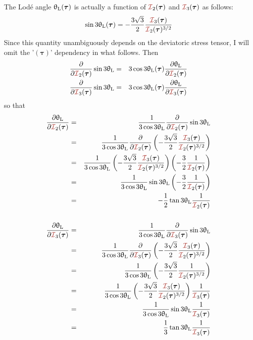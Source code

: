 The Lod\'e angle $\uptheta_{\rm L}(\bm\tau)$ 
is actually a function of ${\III}_2(\bm\tau)$ and ${\III}_3(\bm\tau)$ as follows:
\[
\sin 3\uptheta_{\rm L}(\bm\tau) = 
-\frac{3\sqrt{3}}{2}  \frac{{\III}_3(\bm\tau)}{{\III}_2(\bm\tau)^{3/2}} 
\]
Since this quantity unambiguously depends on the deviatoric stress tensor, 
I will omit the '$(\bm\tau)$' dependency in what follows.
Then
\begin{eqnarray}
\frac{\partial }{\partial {\III}_2(\bm\tau)} \sin 3\uptheta_{\rm L}
&=&3\cos 3\uptheta_{\rm L}(\bm\tau)  \frac{\partial \uptheta_{\rm L}}{\partial {\III}_2(\bm\tau)}\nn\\
\frac{\partial }{\partial {\III}_3(\bm\tau)} \sin 3\uptheta_{\rm L}
&=&3 \cos 3\uptheta_{\rm L}(\bm\tau)  \frac{\partial \uptheta_{\rm L}}{\partial {\III}_3(\bm\tau)}\nn
\end{eqnarray}
so that 
\begin{eqnarray}
\frac{\partial \uptheta_{\rm L}}{\partial {\III}_2(\bm\tau)}
&=&\frac{1}{3 \cos 3\uptheta_{\rm L}} 
\frac{\partial }{\partial {\III}_2(\bm\tau)} \sin 3\uptheta_{\rm L}  \nonumber\\
&=&\frac{1}{3 \cos 3\uptheta_{\rm L}} 
\frac{\partial }{\partial {\III}_2(\bm\tau)}
\left(-\frac{3\sqrt{3}}{2}  \frac{{\III}_3(\bm\tau)}{{\III}_2(\bm\tau)^{3/2}} \right) \nonumber\\
&=&\frac{1}{3 \cos 3\uptheta_{\rm L}} 
\left(-\frac{3\sqrt{3}}{2}  \frac{{\III}_3(\bm\tau)}{{\III}_2(\bm\tau)^{3/2}} \right)
\left( -\frac32 \frac{1}{ {\III}_2(\bm\tau)}\right) \nonumber\\
&=&\frac{1}{3 \cos 3\uptheta_{\rm L}} 
\sin 3\uptheta_{\rm L}
\left( -\frac32 \frac{1}{ {\III}_2(\bm\tau)}\right) \nonumber\\
&=& -\frac12 \tan 3\uptheta_{\rm L} \frac{1}{ {\III}_2(\bm\tau)}  
\nn\\
\nn\\
\frac{\partial \uptheta_{\rm L}}{\partial {\III}_3(\bm\tau)}
&=&\frac{1}{3 \cos 3\uptheta_{\rm L}} 
\frac{\partial }{\partial {\III}_3(\bm\tau)} \sin 3\uptheta_{\rm L} \nonumber \\
&=&\frac{1}{3 \cos 3\uptheta_{\rm L}} 
\frac{\partial }{\partial {\III}_3(\bm\tau)} 
\left(
-\frac{3\sqrt{3}}{2}  \frac{{\III}_3(\bm\tau)}{{\III}_2(\bm\tau)^{3/2}} 
\right) \nonumber\\
&=&\frac{1}{3 \cos 3\uptheta_{\rm L}} 
\left(
-\frac{3\sqrt{3}}{2}  \frac{1}{ {\III}_2(\bm\tau)^{3/2}} 
\right) \nonumber\\
&=&\frac{1}{3 \cos 3\uptheta_{\rm L}} 
\left(
-\frac{3\sqrt{3}}{2}  \frac{{\III}_3(\bm\tau)}{{\III}_2(\bm\tau)^{3/2}} 
\right)
\frac{1}{{\III}_3(\bm\tau)} \nn\\
&=&\frac{1}{3 \cos 3\uptheta_{\rm L}} 
\sin 3 \uptheta_{\rm L}
\frac{1}{{\III}_3(\bm\tau)}\nn \\
&=& \frac13 \tan 3\uptheta_{\rm L} \frac{1}{{\III}_3(\bm\tau)} \nn
\end{eqnarray}
